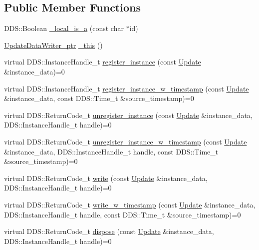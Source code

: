 \subsection*{Public Member Functions}
\begin{DoxyCompactItemize}
\item 
DDS::Boolean \hyperlink{classKnowledge_1_1UpdateDataWriter_a3b01797fe44cd39c33e73df21533ac0e}{\_\-local\_\-is\_\-a} (const char $\ast$id)
\item 
\hyperlink{classKnowledge_1_1UpdateDataWriter}{UpdateDataWriter\_\-ptr} \hyperlink{classKnowledge_1_1UpdateDataWriter_a6e2dd4be898894882d4939440e1bf1e2}{\_\-this} ()
\item 
virtual DDS::InstanceHandle\_\-t \hyperlink{classKnowledge_1_1UpdateDataWriter_a0659c3a8f093103fe840586e93d0ec88}{register\_\-instance} (const \hyperlink{structKnowledge_1_1Update}{Update} \&instance\_\-data)=0
\item 
virtual DDS::InstanceHandle\_\-t \hyperlink{classKnowledge_1_1UpdateDataWriter_aa7171ccd788c135c7bfb66ddd119168e}{register\_\-instance\_\-w\_\-timestamp} (const \hyperlink{structKnowledge_1_1Update}{Update} \&instance\_\-data, const DDS::Time\_\-t \&source\_\-timestamp)=0
\item 
virtual DDS::ReturnCode\_\-t \hyperlink{classKnowledge_1_1UpdateDataWriter_a286e61c2e14474e06986af6ace016658}{unregister\_\-instance} (const \hyperlink{structKnowledge_1_1Update}{Update} \&instance\_\-data, DDS::InstanceHandle\_\-t handle)=0
\item 
virtual DDS::ReturnCode\_\-t \hyperlink{classKnowledge_1_1UpdateDataWriter_a93c8b276b05a8a3de052ad86871e0419}{unregister\_\-instance\_\-w\_\-timestamp} (const \hyperlink{structKnowledge_1_1Update}{Update} \&instance\_\-data, DDS::InstanceHandle\_\-t handle, const DDS::Time\_\-t \&source\_\-timestamp)=0
\item 
virtual DDS::ReturnCode\_\-t \hyperlink{classKnowledge_1_1UpdateDataWriter_aa370a8db4ea1354211f84ce4c0fb159d}{write} (const \hyperlink{structKnowledge_1_1Update}{Update} \&instance\_\-data, DDS::InstanceHandle\_\-t handle)=0
\item 
virtual DDS::ReturnCode\_\-t \hyperlink{classKnowledge_1_1UpdateDataWriter_abcb9ff3935c85cbabdaf9d4550920918}{write\_\-w\_\-timestamp} (const \hyperlink{structKnowledge_1_1Update}{Update} \&instance\_\-data, DDS::InstanceHandle\_\-t handle, const DDS::Time\_\-t \&source\_\-timestamp)=0
\item 
virtual DDS::ReturnCode\_\-t \hyperlink{classKnowledge_1_1UpdateDataWriter_a41a5361c709d4f8cf005d88522358aba}{dispose} (const \hyperlink{structKnowledge_1_1Update}{Update} \&instance\_\-data, DDS::InstanceHandle\_\-t handle)=0

\end{DoxyCompactItemize}

